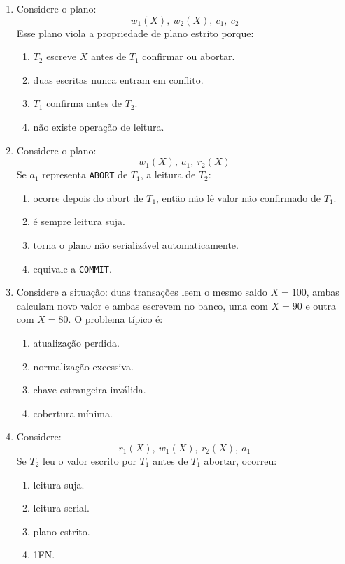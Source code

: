 \documentclass[12pt,a4paper]{article}
\begin{document}
\begin{enumerate}[resume,label=\textbf{Q\arabic*.}]
\item Considere o plano:
\[
w_1(X),\ w_2(X),\ c_1,\ c_2
\]
Esse plano viola a propriedade de plano estrito porque:

\begin{enumerate}[label=\alph*)]
    \item $T_2$ escreve $X$ antes de $T_1$ confirmar ou abortar.
    \item duas escritas nunca entram em conflito.
    \item $T_1$ confirma antes de $T_2$.
    \item não existe operação de leitura.
\end{enumerate}

\item Considere o plano:
\[
w_1(X),\ a_1,\ r_2(X)
\]
Se $a_1$ representa \texttt{ABORT} de $T_1$, a leitura de $T_2$:

\begin{enumerate}[label=\alph*)]
    \item ocorre depois do abort de $T_1$, então não lê valor não confirmado de $T_1$.
    \item é sempre leitura suja.
    \item torna o plano não serializável automaticamente.
    \item equivale a \texttt{COMMIT}.
\end{enumerate}

\item Considere a situação: duas transações leem o mesmo saldo $X=100$, ambas calculam novo valor e ambas escrevem no banco, uma com $X=90$ e outra com $X=80$. O problema típico é:

\begin{enumerate}[label=\alph*)]
    \item atualização perdida.
    \item normalização excessiva.
    \item chave estrangeira inválida.
    \item cobertura mínima.
\end{enumerate}

\item Considere:
\[
r_1(X),\ w_1(X),\ r_2(X),\ a_1
\]
Se $T_2$ leu o valor escrito por $T_1$ antes de $T_1$ abortar, ocorreu:

\begin{enumerate}[label=\alph*)]
    \item leitura suja.
    \item leitura serial.
    \item plano estrito.
    \item 1FN.
\end{enumerate}


\end{enumerate}
\end{document}
